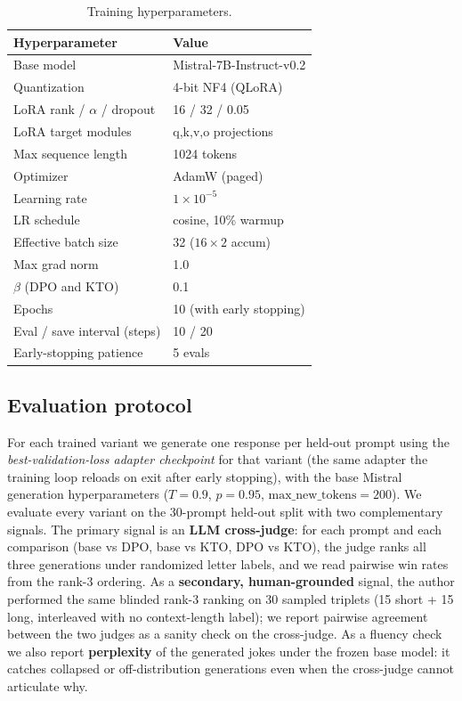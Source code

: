 \begin{table}[t]
\centering
\small
\begin{tabular}{ll}
\toprule
Hyperparameter & Value \\
\midrule
Base model & Mistral-7B-Instruct-v0.2 \\
Quantization & 4-bit NF4 (QLoRA) \\
LoRA rank / $\alpha$ / dropout & 16 / 32 / 0.05 \\
LoRA target modules & q,k,v,o projections \\
Max sequence length & 1024 tokens \\
Optimizer & AdamW (paged) \\
Learning rate & $1{\times}10^{-5}$ \\
LR schedule & cosine, 10\% warmup \\
Effective batch size & 32 ($16 \times 2$ accum) \\
Max grad norm & 1.0 \\
$\beta$ (DPO and KTO) & 0.1 \\
Epochs & 10 (with early stopping) \\
Eval / save interval (steps) & 10 / 20 \\
Early-stopping patience & 5 evals \\
\bottomrule
\end{tabular}
\caption{Training hyperparameters.}
\label{tab:hp}
\end{table}

\subsection{Evaluation protocol}
For each trained variant we generate one response per held-out prompt using the \emph{best-validation-loss adapter checkpoint} for that variant (the same adapter the training loop reloads on exit after early stopping), with the base Mistral generation hyperparameters ($T{=}0.9$, $p{=}0.95$, $\text{max\_new\_tokens}{=}200$).  We evaluate every variant on the 30-prompt held-out split with two complementary signals.  The primary signal is an \textbf{LLM cross-judge}: for each prompt and each comparison (base vs DPO, base vs KTO, DPO vs KTO), the judge ranks all three generations under randomized letter labels, and we read pairwise win rates from the rank-3 ordering.  As a \textbf{secondary, human-grounded} signal, the author performed the same blinded rank-3 ranking on 30 sampled triplets (15 short + 15 long, interleaved with no context-length label); we report pairwise agreement between the two judges as a sanity check on the cross-judge.  As a fluency check we also report \textbf{perplexity} of the generated jokes under the frozen base model: it catches collapsed or off-distribution generations even when the cross-judge cannot articulate why.
